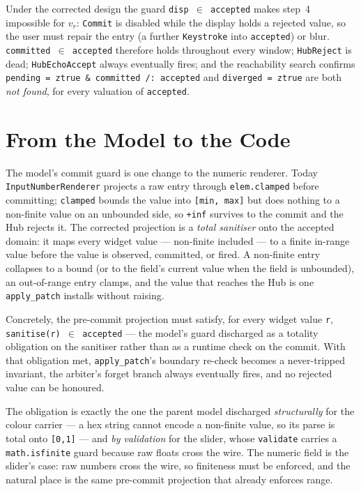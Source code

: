 \documentclass[a4paper,10pt,fleqn]{article}
\begin{document}
Under the corrected design the guard \texttt{disp $\in$ accepted} makes step~4
impossible for $v_r$: \texttt{Commit} is disabled while the display holds a
rejected value, so the user must repair the entry (a further \texttt{Keystroke}
into \texttt{accepted}) or blur.  \texttt{committed $\in$ accepted} therefore holds
throughout every window; \texttt{HubReject} is dead; \texttt{HubEchoAccept} always
eventually fires; and the reachability search confirms
\texttt{pending = ztrue \& committed /: accepted} and \texttt{diverged = ztrue} are
both \emph{not found}, for every valuation of \texttt{accepted}.

\section{From the Model to the Code}

The model's commit guard is one change to the numeric renderer.  Today
\texttt{InputNumberRenderer} projects a raw entry through \texttt{elem.clamped}
before committing; \texttt{clamped} bounds the value into \texttt{[min, max]} but
does nothing to a non-finite value on an unbounded side, so \texttt{+inf} survives
to the commit and the Hub rejects it.  The corrected projection is a \emph{total
sanitiser} onto the accepted domain: it maps every widget value --- non-finite
included --- to a finite in-range value before the value is observed, committed, or
fired.  A non-finite entry collapses to a bound (or to the field's current value
when the field is unbounded), an out-of-range entry clamps, and the value that
reaches the Hub is one \texttt{apply\_patch} installs without raising.

Concretely, the pre-commit projection must satisfy, for every widget value
\texttt{r}, \texttt{sanitise(r) $\in$ accepted} --- the model's guard discharged as
a totality obligation on the sanitiser rather than as a runtime check on the
commit.  With that obligation met, \texttt{apply\_patch}'s boundary re-check
becomes a never-tripped invariant, the arbiter's forget branch always eventually
fires, and no rejected value can be honoured.

The obligation is exactly the one the parent model discharged \emph{structurally}
for the colour carrier --- a hex string cannot encode a non-finite value, so its
parse is total onto \texttt{[0,1]} --- and \emph{by validation} for the slider,
whose \texttt{validate} carries a \texttt{math.isfinite} guard because raw floats
cross the wire.  The numeric field is the slider's case: raw numbers cross the
wire, so finiteness must be enforced, and the natural place is the same
pre-commit projection that already enforces range.
\end{document}
